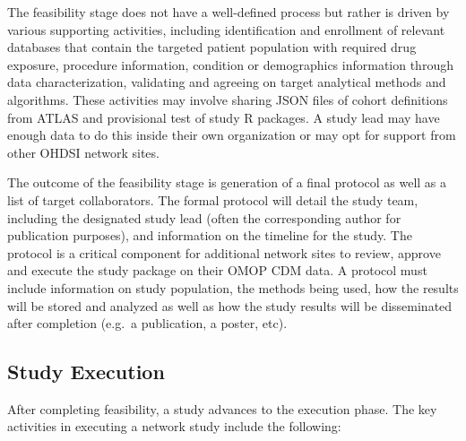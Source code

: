 \documentclass[11pt]{book}
\theoremstyle{definition}
\theoremstyle{definition}
\theoremstyle{definition}
\theoremstyle{remark}
\begin{document}
The feasibility stage does not have a well-defined process but rather is driven by various supporting activities, including identification and enrollment of relevant databases that contain the targeted patient population with required drug exposure, procedure information, condition or demographics information through data characterization, validating and agreeing on target analytical methods and algorithms. These activities may involve sharing JSON files of cohort definitions from ATLAS and provisional test of study R packages. A study lead may have enough data to do this inside their own organization or may opt for support from other OHDSI network sites.

The outcome of the feasibility stage is generation of a final protocol as well as a list of target collaborators. The formal protocol will detail the study team, including the designated study lead (often the corresponding author for publication purposes), and information on the timeline for the study. The protocol is a critical component for additional network sites to review, approve and execute the study package on their OMOP CDM data. A protocol must include information on study population, the methods being used, how the results will be stored and analyzed as well as how the study results will be disseminated after completion (e.g.~a publication, a poster, etc).

\hypertarget{study-execution}{%
\subsection{Study Execution}\label{study-execution}}

After completing feasibility, a study advances to the execution phase. The key activities in executing a network study include the following:
\end{document}
